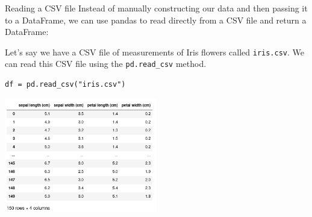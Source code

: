 \documentclass[10pt]{beamer}
\begin{document}
\begin{frame}[label={sec:org37f3120},fragile]{Reading a CSV file}
 Instead of manually constructing our data and then passing it to a DataFrame, we
can use pandas to read directly from a CSV file and return a DataFrame:

Let's say we have a CSV file of measurements of Iris flowers called \texttt{iris.csv}. We
can read this CSV file using the \texttt{pd.read\_csv} method.

\begin{verbatim}
df = pd.read_csv("iris.csv")
\end{verbatim}

\begin{center}
\includegraphics[width=0.5\textwidth]{images/pandas.jpg}
\end{center}
\end{frame}
\end{document}
